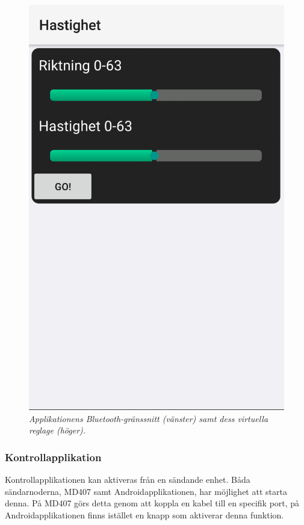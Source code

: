 \documentclass[a4paper]{article}
\begin{document}
\begin{figure}[H]
\includegraphics[scale=0.2]{Mobilapp2.png}
\centering
\caption{\it Applikationens Bluetooth-gränssnitt (vänster) samt dess virtuella reglage (höger).}
\end{figure} 

\subsubsection{Kontrollapplikation}
Kontrollapplikationen kan aktiveras från en sändande enhet. Båda sändarnoderna, MD407 samt Androidapplikationen, har möjlighet att starta denna. På MD407 görs detta genom att koppla en kabel till en specifik port, på Androidapplikationen finns istället en knapp som aktiverar denna funktion.
\end{document}
